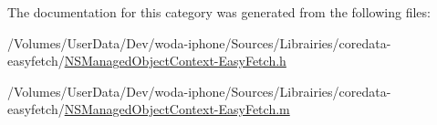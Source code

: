 The documentation for this category was generated from the following files\-:\begin{DoxyCompactItemize}
\item 
/\-Volumes/\-User\-Data/\-Dev/woda-\/iphone/\-Sources/\-Librairies/coredata-\/easyfetch/\hyperlink{_n_s_managed_object_context-_easy_fetch_8h}{N\-S\-Managed\-Object\-Context-\/\-Easy\-Fetch.\-h}\item 
/\-Volumes/\-User\-Data/\-Dev/woda-\/iphone/\-Sources/\-Librairies/coredata-\/easyfetch/\hyperlink{_n_s_managed_object_context-_easy_fetch_8m}{N\-S\-Managed\-Object\-Context-\/\-Easy\-Fetch.\-m}\end{DoxyCompactItemize}
